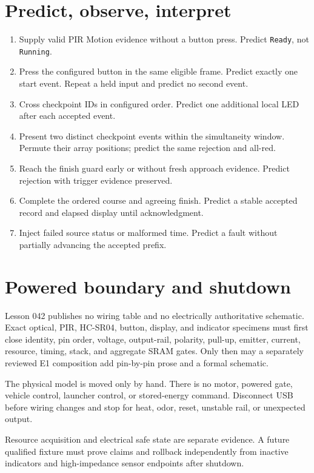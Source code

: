 \documentclass[11pt]{article}
\begin{document}
\section{Predict, observe, interpret}
\begin{enumerate}
 \item Supply valid PIR Motion evidence without a button press. Predict
       \texttt{Ready}, not \texttt{Running}.
 \item Press the configured button in the same eligible frame. Predict exactly
       one start event. Repeat a held input and predict no second event.
 \item Cross checkpoint IDs in configured order. Predict one additional local
       LED after each accepted event.
 \item Present two distinct checkpoint events within the simultaneity window.
       Permute their array positions; predict the same rejection and all-red.
 \item Reach the finish guard early or without fresh approach evidence.
       Predict rejection with trigger evidence preserved.
 \item Complete the ordered course and agreeing finish. Predict a stable
       accepted record and elapsed display until acknowledgment.
 \item Inject failed source status or malformed time. Predict a fault without
       partially advancing the accepted prefix.
\end{enumerate}

\section{Powered boundary and shutdown}
Lesson 042 publishes no wiring table and no electrically authoritative
schematic. Exact optical, PIR, HC-SR04, button, display, and indicator
specimens must first close identity, pin order, voltage, output-rail, polarity,
pull-up, emitter, current, resource, timing, stack, and aggregate SRAM gates.
Only then may a separately reviewed E1 composition add pin-by-pin prose and a
formal schematic.

The physical model is moved only by hand. There is no motor, powered gate,
vehicle control, launcher control, or stored-energy command. Disconnect USB
before wiring changes and stop for heat, odor, reset, unstable rail, or
unexpected output.

Resource acquisition and electrical safe state are separate evidence. A
future qualified fixture must prove claims and rollback independently from
inactive indicators and high-impedance sensor endpoints after shutdown.
\end{document}
